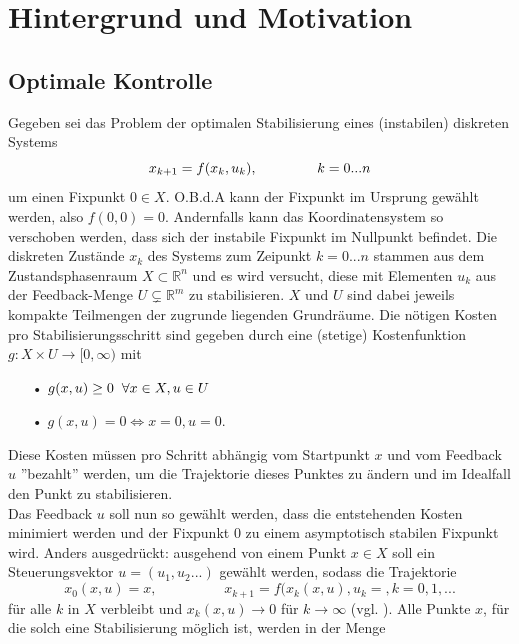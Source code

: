 \documentclass[12pt,a4paper,twoside]{article}
\begin{document}
\section{Hintergrund und Motivation}
	\subsection{Optimale Kontrolle}
	Gegeben sei das Problem der optimalen Stabilisierung eines (instabilen) diskreten Systems
	\begin{equation}
		x_{k+1}=f(x_k,u_k), \hspace{1,5cm} k=0...n
	\end{equation}
	um einen Fixpunkt $0\in X$. O.B.d.A kann der Fixpunkt im Ursprung gewählt werden, also $f(0,0)=0$. Andernfalls kann das Koordinatensystem so verschoben werden, dass sich der instabile Fixpunkt im Nullpunkt befindet. Die diskreten Zustände $x_k$ des Systems zum Zeipunkt $k=0...n$ stammen aus dem Zustandsphasenraum $X\subset \mathbb{R}^n$ und es wird versucht, diese mit Elementen $u_k$ aus der Feedback-Menge $U\subsetneq \mathds{R}^m$ zu stabilisieren.
$X$ und $U$ sind dabei jeweils kompakte Teilmengen der zugrunde liegenden
	Grundräume. Die nötigen Kosten pro Stabilisierungsschritt sind gegeben durch eine (stetige) Kostenfunktion $g: X
	\times U \rightarrow [0,\infty)$ mit 
	\begin{itemize}
		\item[•]$g(x,u)\geq 0\hspace{0,2cm}\forall x\in X, u\in U$
		\item[•]$g(x,u)=0 \Leftrightarrow x=0, u=0$.
	\end{itemize}
	Diese Kosten müssen pro Schritt abhängig vom Startpunkt $x$ und vom Feedback $u$ ''bezahlt'' werden, um die Trajektorie dieses Punktes zu ändern und im Idealfall den Punkt zu stabilisieren. \\
	Das Feedback $u$ soll nun so gewählt werden, dass die entstehenden Kosten minimiert werden und der Fixpunkt $0$ 
	zu einem asymptotisch stabilen Fixpunkt wird. Anders ausgedrückt: ausgehend von einem Punkt $x\in X$ soll ein
	Steuerungsvektor $u=(u_1,u_2...)$ gewählt werden, sodass die Trajektorie 
	\begin{equation*}
		x_0(x,u)=x, \hspace{2cm} x_{k+1}=f(x_k(x,u),u_k=, k=0,1,...
	\end{equation*}
	für alle $k$ in $X$ verbleibt und $x_k(x,u)\rightarrow 0$ für $k\rightarrow\infty$ (vgl. \cite{Grune2005}). Alle Punkte $x$, für die solch eine Stabilisierung möglich ist, werden in der Menge 
\end{document}
